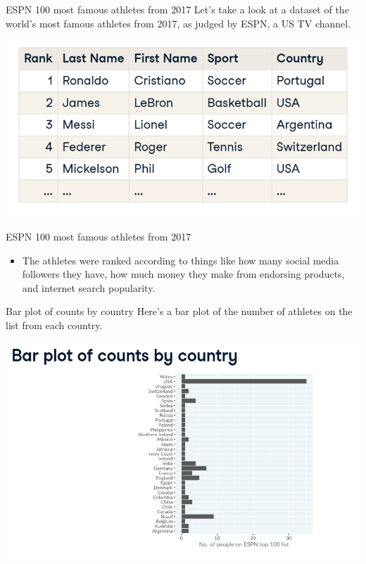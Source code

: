 \documentclass[
  ignorenonframetext,
]{beamer}
\providecommand{\tightlist}{%
  \setlength{\itemsep}{0pt}\setlength{\parskip}{0pt}}
\begin{document}
\begin{frame}{ESPN 100 most famous athletes from 2017}
\label{espn-100-most-famous-athletes-from-2017}
Let's take a look at a dataset of the world's most famous athletes from
2017, as judged by ESPN, a US TV channel.

\includegraphics{../images/im49.png}
\end{frame}

\begin{frame}{ESPN 100 most famous athletes from 2017}
\label{espn-100-most-famous-athletes-from-2017-1}
\begin{itemize}
\tightlist
\item
  The athletes were ranked according to things like how many social
  media followers they have, how much money they make from endorsing
  products, and internet search popularity.
\end{itemize}
\end{frame}

\begin{frame}{Bar plot of counts by country}
\label{bar-plot-of-counts-by-country}
Here's a bar plot of the number of athletes on the list from each
country.

\includegraphics{../images/im50.png}
\end{frame}
\end{document}
